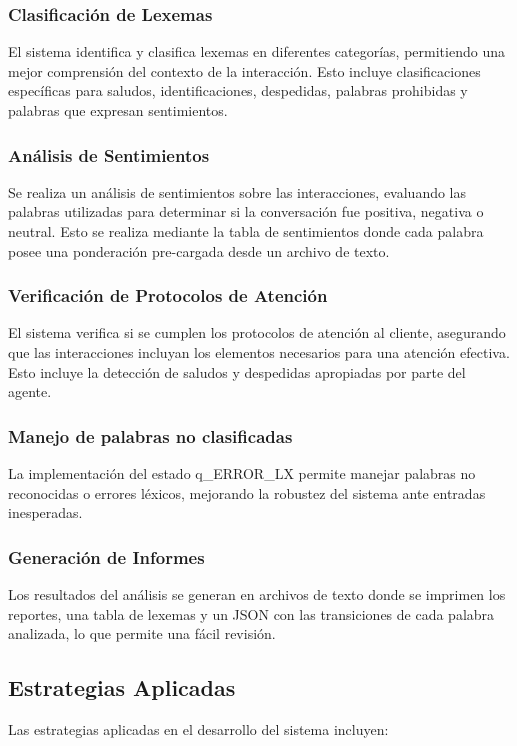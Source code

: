 \documentclass[12pt,a4paper]{scrartcl} %
\begin{document}
\subsubsection{Clasificación de Lexemas}
El sistema identifica y clasifica lexemas en diferentes categorías, permitiendo una mejor
comprensión del contexto de la interacción. Esto incluye clasificaciones específicas para
saludos, identificaciones, despedidas, palabras prohibidas y palabras que expresan
sentimientos.

\subsubsection{Análisis de Sentimientos}
Se realiza un análisis de sentimientos sobre las interacciones, evaluando las palabras
utilizadas para determinar si la conversación fue positiva, negativa o neutral. Esto se realiza
mediante la tabla de sentimientos donde cada palabra posee una ponderación pre-cargada desde un
archivo de texto.

\subsubsection{Verificación de Protocolos de Atención}
El sistema verifica si se cumplen los protocolos de atención al cliente, asegurando que las
interacciones incluyan los elementos necesarios para una atención efectiva. Esto incluye la
detección de saludos y despedidas apropiadas por parte del agente.

\subsubsection{Manejo de palabras no clasificadas}
La implementación del estado q\_ERROR\_LX permite manejar palabras no reconocidas o errores
léxicos, mejorando la robustez del sistema ante entradas inesperadas.

\subsubsection{Generación de Informes}
Los resultados del análisis se generan en archivos de texto donde se imprimen los reportes, una
tabla de lexemas y un JSON con las transiciones de cada palabra analizada, lo que permite una
fácil revisión.

\subsection{Estrategias Aplicadas}
Las estrategias aplicadas en el desarrollo del sistema incluyen:
\end{document}
